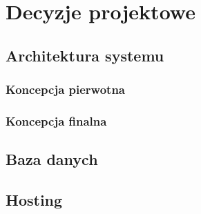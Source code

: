 \chapter{Decyzje projektowe}
\label{chap:3}
\section{Architektura systemu}
\subsection{Koncepcja pierwotna}

\subsection{Koncepcja finalna}

\section{Baza danych}

\section{Hosting}
